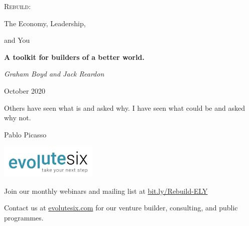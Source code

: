 \documentclass[
        11pt, %
        openany, %
        graham, %
]{evolutesixbook1}
\begin{document}
\begin{titlepage}
        \centering
		 \vspace*{1.0cm}
		{\sffamily \scshape\Huge Rebuild: \par\medskip The Economy, Leadership, \par\bigskip  and You} \par
         \vspace{0.5cm}
        {\large\bfseries A toolkit for builders of a better world. \par}
        \vspace{1.0cm}
        {\Large\itshape Graham Boyd and Jack Reardon\par}
        {\large October 2020 \par}                
        \begin{chapterquotation}
                \vspace{1cm} 
                        Others have seen what is and asked why. I have seen what could be and asked why not.
                
                \raggedleft\textemdash Pablo Picasso
        \end{chapterquotation}

\bigskip
{

}
     
        \vfill
        \includegraphics[width=0.35\textwidth]{./Images/logo_evolutesix-05} \hfill

        Join our monthly webinars and mailing list at \url{bit.ly/Rebuild-ELY}

        Contact us at \url{evolutesix.com} for our venture builder, consulting, and public programmes.
\end{titlepage}


\end{document}
